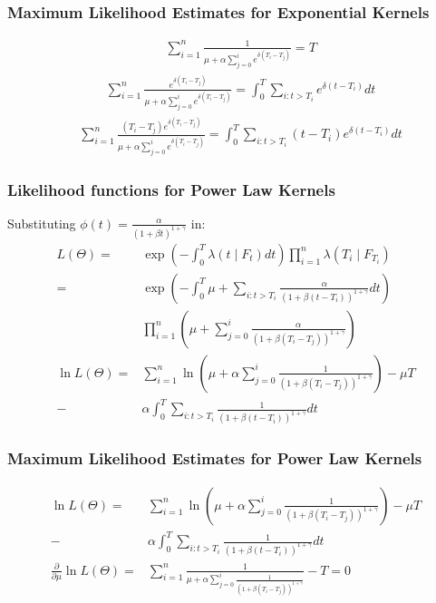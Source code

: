 \documentclass{beamer}
\begin{document}
\begin{frame}
\frametitle{Maximum Likelihood Estimates for Exponential Kernels}
\begin{equation}
\begin{split}
&\sum_{i=1}^n \frac{1}{\mu + \alpha \sum_{j=0}^i e^{\delta (T_i - T_j)}} = T
\end{split}
\end{equation}
\begin{equation}
\begin{split}
& \sum_{i=1}^n \frac{e^{\delta (T_i - T_j)}}{\mu + \alpha \sum_{j=0}^i e^{\delta (T_i - T_j)}} = \int_{0}^{T}  \sum_{i: t>T_i} e^{\delta (t - T_i)} dt
\end{split}
\end{equation}
\begin{equation}
\begin{split}
&\sum_{i=1}^n \frac{(T_i - T_j)e^{\delta (T_i - T_j)}}{\mu + \alpha \sum_{j=0}^i e^{\delta (T_i - T_j)}} = \int_{0}^{T}  \sum_{i: t>T_i} (t - T_i)e^{\delta (t - T_i)} dt
\end{split}
\end{equation}
\end{frame}

\begin{frame}
\frametitle{Likelihood functions for Power Law Kernels}
Substituting $\phi(t) = \frac{\alpha}{(1 + \beta t)^{1 + \gamma}}$ in:
\begin{equation*}
\begin{split}
L(\Theta) = &\exp(-\int_{0}^{T} \lambda(t \mid F_t) dt) \prod_{i=1}^n \lambda(T_i \mid F_{T_{i}})\\
= &\exp(-\int_{0}^{T}  \mu + \sum_{i: t>T_i} \frac{\alpha}{(1 + \beta (t - T_i))^{1 + \gamma}} dt) \\
&\prod_{i=1}^n (\mu + \sum_{j=0}^i \frac{\alpha}{(1 + \beta (T_i - T_j))^{1 + \gamma}})\\[5mm]
\ln L(\Theta) = &\sum_{i=1}^n \ln(\mu + \alpha\sum_{j=0}^i \frac{1}{(1 + \beta (T_i - T_j))^{1 + \gamma}}) - \mu T\\
- &\alpha \int_{0}^{T} \sum_{i: t>T_i} \frac{1}{(1 + \beta (t - T_i))^{1 + \gamma}} dt
\end{split}
\end{equation*}
\end{frame}

\begin{frame}
\frametitle{Maximum Likelihood Estimates for Power Law Kernels}
\begin{equation*}
\begin{split}
\ln L(\Theta) = &\sum_{i=1}^n \ln(\mu + \alpha\sum_{j=0}^i \frac{1}{(1 + \beta (T_i - T_j))^{1 + \gamma}}) - \mu T\\
- &\alpha \int_{0}^{T} \sum_{i: t>T_i} \frac{1}{(1 + \beta (t - T_i))^{1 + \gamma}} dt\\[7mm]
\frac{\partial}{\partial \mu} \ln L(\Theta) = &\sum_{i=1}^n \frac{1}{\mu + \alpha\sum_{j=0}^i \frac{1}{(1 + \beta (T_i - T_j))^{1 + \gamma}}} - T = 0\\
\end{split}
\end{equation*}
\end{frame}
\end{document}
